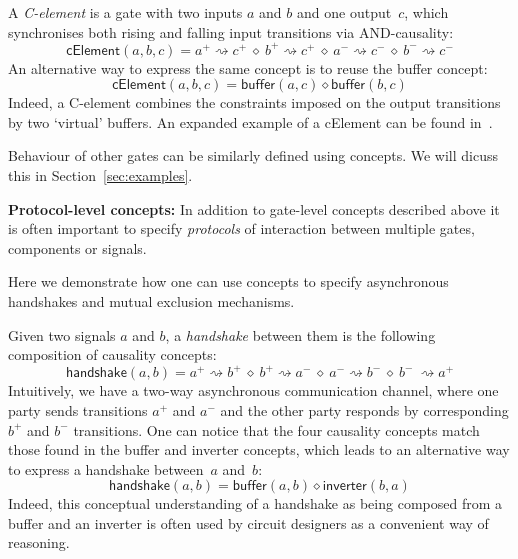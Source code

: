 \documentclass[british, journal]{IEEEtran}
\begin{document}
\noindent A \emph{C-element} is a gate with two inputs $a$ and $b$ and one
output~$c$, which synchronises both rising and falling input transitions
via AND-causality:
\[
\mathsf{cElement}(a, b, c)=a^{+}\!\rightsquigarrow\! c^{+}\ \diamond\
b^{+}\!\rightsquigarrow\! c^{+}\ \diamond\ a^{-}\!\rightsquigarrow\! c^{-}\
\diamond\ b^{-}\!\rightsquigarrow\! c^{-}
\]
An alternative way to express the same concept is to reuse the buffer concept:
\[
\mathsf{cElement}(a, b, c)=\mathsf{buffer}(a, c) \diamond \mathsf{buffer}(b, c)
\]
Indeed, a C-element combines the constraints imposed on the output
transitions by two `virtual' buffers. An expanded example of a cElement can be
found in~\cite{2015_Beaumont_MEMOCODE}.

Behaviour of other gates can be similarly defined using concepts. We will dicuss
this in Section~\ref{sec:examples}.

\textbf{Protocol-level concepts:} In addition to gate-level concepts
described above it is often important to specify \emph{protocols}
of interaction between multiple gates, components or signals. 

Here we demonstrate how one can use concepts to specify asynchronous handshakes
and mutual exclusion mechanisms.

Given two signals $a$ and $b$, a \emph{handshake} between them is
the following composition of causality concepts:
\[
\mathsf{handshake}(a, b)=a^{+}\!\rightsquigarrow\! b^{+}\ \diamond\
b^{+}\!\rightsquigarrow\! a^{-}\ \diamond\ a^{-}\!\rightsquigarrow\! b^{-}\
\diamond\ b^{-}\ \rightsquigarrow\! a^{+}
\]
Intuitively, we have a two-way asynchronous communication channel,
where one party sends transitions $a^{+}$ and $a^{-}$ and the other
party responds by corresponding $b^{+}$ and $b^{-}$ transitions.
One can notice that the four causality concepts match those found
in the buffer and inverter concepts, which leads to an alternative
way to express a handshake between~$a$ and~$b$:
\[
\mathsf{handshake}(a, b)=\mathsf{buffer}(a, b) \diamond\mathsf{inverter}(b, a)
\]
Indeed, this conceptual understanding of a handshake as being composed
from a buffer and an inverter is often used by circuit designers as
a convenient way of reasoning.
\end{document}

